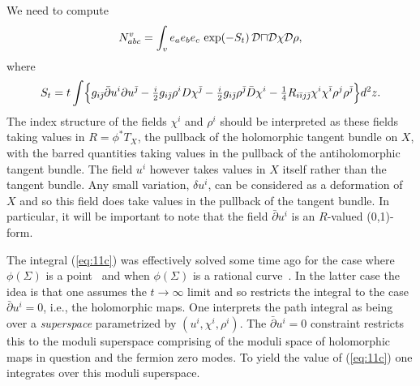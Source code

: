 We need to compute
\begin{equation}
  N^v_{abc} = \int_ve_ae_be_c\,\exp(-S_t)\,\cal{D} u\cal{D}\chi\cal{D}\rho,
		\label{eq:11c}
\end{equation}
where
\begin{equation}
  S_t=t\int\Bigl\{g_{i\bar\jmath}\bar\partial u^i\partial u^{\bar\jmath}
	- {\textstyle\frac{i}{2}}g_{i\bar\jmath}\rho^iD\chi^{\bar\jmath}
	- {\textstyle\frac{i}{2}}g_{i\bar\jmath}\rho^{\bar\jmath}\bar D\chi^i
	- {\textstyle\frac{1}{4}}R_{i\bar\imath j\bar\jmath}\chi^i\chi^{\bar\imath}
	\rho^j\rho^{\bar\jmath}\Bigr\}d^2z. \label{eq:11a}
\end{equation}
The index structure of the fields $\chi^i$ and $\rho^i$ should be
interpreted as these fields taking values in $R=\phi^*T_X$,
the pullback of the holomorphic tangent bundle on $X$, with the barred
quantities taking values in the pullback of the antiholomorphic tangent
bundle. The field $u^i$ however takes values in $X$ itself rather than
the tangent bundle.
Any small variation, $\delta u^i$, can be considered as a deformation
of $X$ and so this field does take values in the pullback of the
tangent bundle. In particular, it will be important to note that the
field $\bar\partial u^i$ is an $R$-valued (0,1)-form.

The integral (\ref{eq:11c}) was effectively solved some time ago for
the case where $\phi(\Sigma)$ is a point~\cite{SW:coup} and when
$\phi(\Sigma)$ is a rational curve~\cite{DSWW:np}. In the latter case
the idea is that
one assumes the $t\to\infty$ limit and so restricts the integral to
the case $\bar\partial u^i=0$, i.e., the holomorphic maps. One
interprets the path integral as being over a {\em superspace\/}
parametrized by $(u^i,\chi^i,\rho^i)$. The $\bar\partial u^i=0$
constraint restricts this to the moduli superspace comprising of the
moduli space of holomorphic maps in question and the fermion zero
modes.
To yield the value of (\ref{eq:11c}) one integrates over this moduli
superspace.

